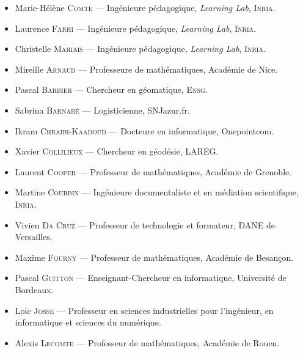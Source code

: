
{\small
\begin{itemize}\jazzitem
\item Marie-Hélène \textsc{Comte} --- Ingénieure pédagogique, \textit{Learning Lab}, \textsc{Inria}.
\item Laurence \textsc{Farhi} --- Ingénieure pédagogique, \textit{Learning Lab}, \textsc{Inria}.
\item Christelle \textsc{Mariais} --- Ingénieure pédagogique, \textit{Learning Lab}, \textsc{Inria}.
\end{itemize}}



{\small
\begin{itemize}\jazzitem
\item Mireille \textsc{Arnaud} --- Professeure de mathématiques, Académie de Nice.
\item Pascal \textsc{Barbier} --- Chercheur en géomatique, \textsc{Ensg}.
\item Sabrina \textsc{Barnabé} --- Logisticienne, SNJazur.fr.
\item Ikram \textsc{Chraibi-Kaadoud} --- Docteure en informatique, Onepointcom.
\item Xavier \textsc{Collilieux} --- Chercheur en géodésie, LAREG.
\item Laurent \textsc{Cooper} --- Professeur de mathématiques, Académie de Grenoble.
\item Martine \textsc{Courbin} --- Ingénieure documentaliste et en médiation scientifique, \textsc{Inria}.
\item Vivien \textsc{Da Cruz} --- Professeur de technologie et formateur, DANE de Versailles.
\item Maxime \textsc{Fourny} --- Professeur de mathématiques, Académie de Besançon.
\item Pascal \textsc{Guitton} --- Enseignant-Chercheur en informatique, Université de Bordeaux.
\item Loic \textsc{Josse} --- Professeur en sciences industrielles pour l'ingénieur, en informatique et sciences du numérique.
\item Alexis \textsc{Lecomte} --- Professeur de mathématiques, Académie de Rouen.
\end{itemize}}



